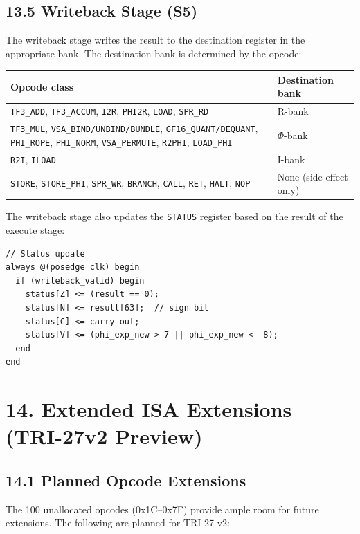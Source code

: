 \subsection{13.5 Writeback Stage (S5)}\label{fa_71:writeback}

The writeback stage writes the result to the destination register
in the appropriate bank. The destination bank is determined by
the opcode:

\begin{longtable}[]{@{}ll@{}}
\toprule\noalign{}
Opcode class & Destination bank \\
\midrule\noalign{}
\endhead
\bottomrule\noalign{}
\endlastfoot
\texttt{TF3\_ADD}, \texttt{TF3\_ACCUM}, \texttt{I2R}, \texttt{PHI2R},
\texttt{LOAD}, \texttt{SPR\_RD} & R-bank \\
\texttt{TF3\_MUL}, \texttt{VSA\_BIND/UNBIND/BUNDLE},
\texttt{GF16\_QUANT/DEQUANT}, \texttt{PHI\_ROPE},
\texttt{PHI\_NORM}, \texttt{VSA\_PERMUTE}, \texttt{R2PHI},
\texttt{LOAD\_PHI} & $\Phi$-bank \\
\texttt{R2I}, \texttt{ILOAD} & I-bank \\
\texttt{STORE}, \texttt{STORE\_PHI}, \texttt{SPR\_WR},
\texttt{BRANCH}, \texttt{CALL}, \texttt{RET}, \texttt{HALT},
\texttt{NOP} & None (side-effect only) \\
\end{longtable}

The writeback stage also updates the \texttt{STATUS} register
based on the result of the execute stage:

\begin{verbatim}
// Status update
always @(posedge clk) begin
  if (writeback_valid) begin
    status[Z] <= (result == 0);
    status[N] <= result[63];  // sign bit
    status[C] <= carry_out;
    status[V] <= (phi_exp_new > 7 || phi_exp_new < -8);
  end
end
\end{verbatim}

\section{14. Extended ISA Extensions (TRI-27v2 Preview)}\label{fa_71:extensions}

\subsection{14.1 Planned Opcode Extensions}\label{fa_71:opcode-extensions}

The 100 unallocated opcodes (0x1C--0x7F) provide ample room for
future extensions. The following are planned for TRI-27 v2:

